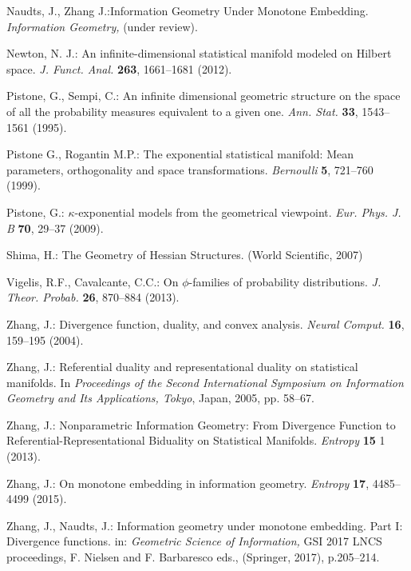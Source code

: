 \documentclass[graybox]{svmult}
\begin{document}
\begin{thebibliography}{99}
Naudts, J., Zhang J.:Information Geometry Under Monotone Embedding.
{\em Information Geometry,} (under review). 

Newton, N. J.:
An infinite-dimensional statistical manifold modeled on Hilbert space.
{\em J. Funct. Anal.} {\bf 263}, 1661--1681 (2012).

Pistone, G., Sempi, C.: An infinite dimensional geometric structure on the space 
of all the probability measures equivalent to a given one. {\em Ann. Stat.} {\bf 33}, 1543--1561 (1995).

Pistone G., Rogantin M.P.: The exponential statistical manifold: Mean parameters, 
orthogonality and space transformations. {\em Bernoulli} {\bf 5}, 
721--760 (1999).

Pistone, G.: $\kappa$-exponential models from the geometrical viewpoint. 
{\em Eur. Phys. J. B} {\bf 70}, 29--37 (2009).

Shima, H.: The Geometry of Hessian Structures.
(World Scientific, 2007)


Vigelis, R.F., Cavalcante, C.C.:
On $\phi$-families of probability distributions.
{\em J. Theor. Probab.} {\bf 26}, 870--884 (2013).

Zhang, J.: Divergence function, duality, and convex analysis. {\em Neural 
Comput.} {\bf 16}, 159--195 (2004).

Zhang, J.:
Referential duality and representational duality on statistical manifolds.
In {\it Proceedings of the Second International Symposium on Information Geometry and Its Applications, Tokyo},
Japan, 2005, pp. 58--67.

Zhang, J.: Nonparametric Information Geometry: From Divergence
Function to Referential-Representational Biduality on
Statistical Manifolds.
{\em Entropy} {\bf 15} 1 (2013).

Zhang, J.: On monotone embedding in information geometry.
{\em Entropy}  {\bf 17}, 4485--4499 (2015).

Zhang, J., Naudts, J.: Information geometry under monotone embedding. Part I: Divergence functions.
in: {\em Geometric Science of Information,}
GSI 2017 LNCS proceedings,
F. Nielsen and F. Barbaresco eds., (Springer, 2017), p.205--214. 


\end{thebibliography}
\end{document}
